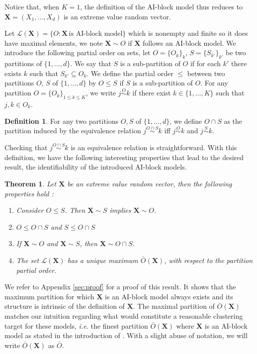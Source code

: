 \documentclass[11pt]{article}
\newtheorem{theorem}{Theorem}
\theoremstyle{definition}
\newtheorem{definition}{Definition}
\begin{document}
	Notice that, when $K=1$, the definition of the AI-block model thus reduces to $\textbf{X} = (X_1,\dots,X_d)$ is an extreme value random vector.
	
	Let $\mathcal{L}(\textbf{X}) = \{O : \textbf{X} \, \textrm{is AI-block model}\}$ which is nonempty and finite so it does have maximal elements, we note $\textbf{X} \sim O$ if $\textbf{X}$ follows an AI-block model. We introduce the following partial order on sets, let $O = \{O_k\}_k$, $S = \{S_{k'}\}_{k'}$ be two partitions of $\{1,\dots,d\}$. We say that $S$ is a sub-partition of $O$ if for each $k'$ there exists $k$ such that $S_{k'} \subseteq O_k$. We define the partial order $\leq$ between two partitions $O$, $S$ of $\{1,\dots,d\}$ by $O \leq S$ if $S$ is a sub-partition of $O$. For any partition $O = \{O_k\}_{1 \leq k \leq K}$, we write $j \overset{O}{\sim} k$ if there exist $k \in \{1,\dots,K\}$ such that $j,k \in O_k$.
	
	\begin{definition}
		For any two partitions $O, S$ of $\{1,\dots,d\}$, we define $O \cap S$ as the partition induced by the equivalence relation $j \overset{O \cap S}{\sim} k$ iff $j \overset{O}{\sim} k$ and $j \overset{S}{\sim} k$.
	\end{definition}
	Checking that $j \overset{O \cap S}{\sim} k$ is an equivalence relation is straightforward. With this definition, we have the following interesting properties that lead to the desired result, the identifiability of the introduced AI-block models.
	\begin{theorem}
		\label{thm:unicity}
		Let $\textbf{X}$ be an extreme value random vector, then the following properties hold :
		\begin{enumerate}
			\item Consider $O \leq S$. Then $\textbf{X} \sim S$ implies $\textbf{X} \sim O$.
			\item $O \leq O\cap S$ and $S \leq O \cap S$
			\item If $\textbf{X} \sim O$ and $\textbf{X} \sim S$, then  $\textbf{X} \sim O \cap S$.
			\item The set $\mathcal{L}(\textbf{X})$ has a unique maximum $\bar{O}(\textbf{X})$, with respect to the partition partial order.
		\end{enumerate}
	\end{theorem}
	
	We refer to Appendix \ref{sec:proof} for a proof of this result. It shows that the maximum partition for which $\textbf{X}$ is an AI-block model always exists and its structure is intrinsic of the definition of $\textbf{X}$. The maximal partition of $\bar{O}(\textbf{X})$ matches our intuition regarding what would constitute a reasonable clustering target for these models, \emph{i.e.} the finest partition $\bar{O}(\textbf{X})$ where $\textbf{X}$ is an AI-block model as stated in the introduction of \cite{NIPS2017_37d097ca}. With a slight abuse of notation, we will write $\bar{O}(\textbf{X})$ as $\bar{O}$. 
	
\end{document}
